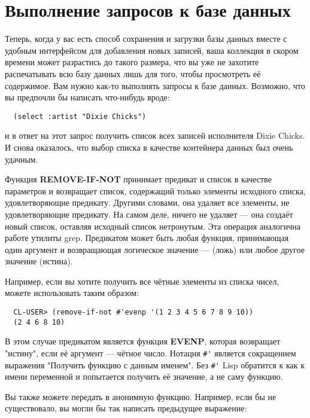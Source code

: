 \section{Выполнение запросов к базе данных}

Теперь, когда у вас есть способ сохранения и загрузки базы данных вместе с удобным
интерфейсом для добавления новых записей, ваша коллекция в скором времени может разрастись
до такого размера, что вы уже не захотите распечатывать всю базу данных лишь для того,
чтобы просмотреть её содержимое. Вам нужно как-то выполнять запросы к базе
данных. Возможно, что вы предпочли бы написать что-нибудь вроде:

\begin{verbatim}
  (select :artist "Dixie Chicks")
\end{verbatim}

и в ответ на этот запрос получить список всех записей исполнителя Dixie Chicks. И снова
оказалось, что выбор списка в качестве контейнера данных был очень удачным.

Функция \textbf{REMOVE-IF-NOT} принимает предикат и список в качестве параметров и
возвращает список, содержащий только элементы исходного списка, удовлетворяющие
предикату. Другими словами, она удаляет все элементы, не удовлетворяющие предикату. На
самом деле,  ничего не удаляет --- она создаёт новый список, оставляя
исходный список нетронутым. Эта операция аналогична работе утилиты grep. Предикатом может
быть любая функция, принимающая один аргумент и возвращающая логическое значение ---
 (ложь) или любое другое значение (истина).

Например, если вы хотите получить все чётные элементы из списка чисел, можете использовать
 таким образом:

\begin{verbatim}
  CL-USER> (remove-if-not #'evenp '(1 2 3 4 5 6 7 8 9 10))
  (2 4 6 8 10)
\end{verbatim}

В этом случае предикатом является функция \textbf{EVENP}, которая возвращает "истину",
если её аргумент --- чётное число. Нотация \lstinline!#'! является сокращением выражения
"Получить функцию с данным именем". Без \lstinline!#'! Lisp обратится к  как к
имени переменной и попытается получить её значение, а не саму функцию.

Вы также можете передать в  анонимную функцию. Например, если бы
 не существовало, вы могли бы так написать предыдущее выражение:

